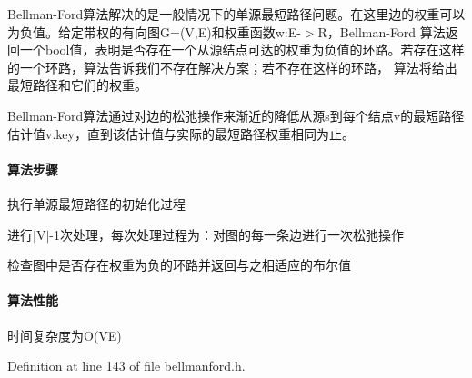 Bellman-\/\+Ford算法解决的是一般情况下的单源最短路径问题。在这里边的权重可以为负值。给定带权的有向图\+G=(V,E)和权重函数w\+:E-\/$>$R，\+Bellman-\/\+Ford 算法返回一个bool值，表明是否存在一个从源结点可达的权重为负值的环路。若存在这样的一个环路，算法告诉我们不存在解决方案；若不存在这样的环路， 算法将给出最短路径和它们的权重。

Bellman-\/\+Ford算法通过对边的松弛操作来渐近的降低从源s到每个结点v的最短路径估计值v.key，直到该估计值与实际的最短路径权重相同为止。

\paragraph*{算法步骤}


\begin{DoxyItemize}
\item 执行单源最短路径的初始化过程
\item 进行$\vert$\+V$\vert$-\/1次处理，每次处理过程为：对图的每一条边进行一次松弛操作
\item 检查图中是否存在权重为负的环路并返回与之相适应的布尔值
\end{DoxyItemize}

\paragraph*{算法性能}

时间复杂度为\+O(\+V\+E) 

Definition at line 143 of file bellmanford.\+h.

\hypertarget{namespace_introduction_to_algorithm_1_1_graph_algorithm_a8839165b9e3d4c8c2ccac4cdc28aadd5}{}
